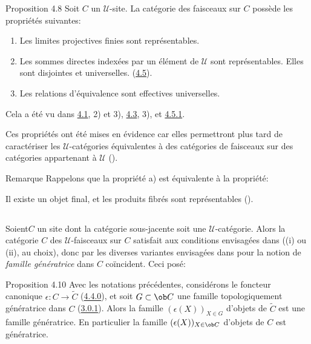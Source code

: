 \begin{enonce*}{Proposition 4.8}
Soit $C$ un $𝒰$-site. La catégorie des faisceaux sur $C$
possède les propriétés suivantes:
\begin{enumerate}
\renewcommand{\theenumi}{\alph{enumi}}
\renewcommand{\labelenumi}{\theenumi)}
\item Les limites projectives finies sont représentables.

\item Les sommes directes indexées par un élément de $𝒰$
  sont représentables. Elles sont disjointes et
  universelles. (\hyperref[II.def4.5]{4.5}).

\item Les relations d'équivalence sont effectives universelles.
\end{enumerate}
\end{enonce*}

Cela a été vu dans \hyperref[II.theo4.1]{4.1}, 2) et 3), \hyperref[II.prop4.3]{4.3},
3), et \hyperref[II.exem4.5.1]{4.5.1}.

Ces propriétés ont été mises en évidence car elles
permettront plus tard de caractériser les $𝒰$-catégories
équivalentes à des catégories de faisceaux sur des catégories
appartenant à $𝒰$ ().

\begin{enonce*}[remark]{Remarque}
Rappelons que la propriété a) est équivalente à la
propriété:

Il existe un objet final, et les produits fibrés sont
représentables ().
\end{enonce*}

\setcounter{subsection}{8}
\subsection{}
Soient\pageoriginale $C$ un site dont la catégorie sous-jacente
soit une $𝒰$-catégorie. Alors la catégorie $C$ des
$𝒰$-faisceaux sur $C$ satisfait aux conditions envisagées
dans  ((i) ou (ii), au choix), donc par \loccit les
diverses variantes envisagées dans  pour la notion
de \emph{famille
  génératrice} dans $C$ coïncident. Ceci posé:

\begin{enonce*}{Proposition 4.10}
Avec les notations précédentes, considérons le foncteur
canonique $\epsilon:C\rightarrow \widetilde{C}$
(\hyperref[II.subsubsec4.4.0]{4.4.0}), et soit $G\subset \ob C$ une famille
topologiquement génératrice dans $C$ (\hyperref[II.def3.0.1]{3.0.1}). Alors
la famille $(\epsilon(X))_{X\in G}$ d'objets de $\widetilde{C}$ est
une famille génératrice. En particulier la famille
$(\epsilon(X))_{X\in \ob C}$ d'objets de $C$ est génératrice.
\end{enonce*}

